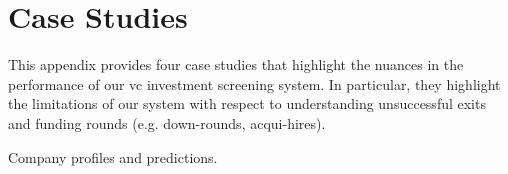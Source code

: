 \chapter{Case Studies}
\label{appendix:case_studies}

This appendix provides four case studies that highlight the nuances in the performance of our \gls{vc} investment screening system. In particular, they highlight the limitations of our system with respect to understanding unsuccessful exits and funding rounds (e.g. down-rounds, acqui-hires).

\begin{table}[!htb]
    \centering
    \scalebox{0.9}{}
    \caption[Company profiles and predictions]{Company profiles and predictions.}
    \label{tab:discussion:example_predictions}
\end{table}

